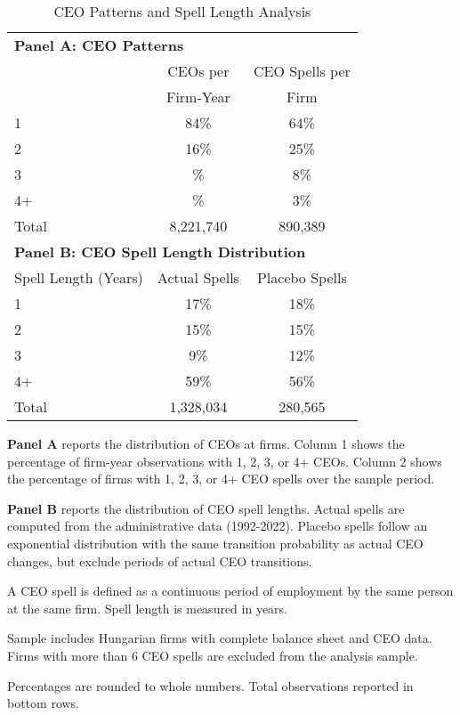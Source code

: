 \begin{table}[htbp]
\centering
\caption{CEO Patterns and Spell Length Analysis}
\label{tab:ceo_patterns}
\begin{tabular}{lcc}
\toprule
\multicolumn{3}{l}{\textbf{Panel A: CEO Patterns}} \\
 & CEOs per & CEO Spells per \\
 & Firm-Year & Firm \\
\midrule
1 & 84\% & 64\% \\
2 & 16\% & 25\% \\
3 & \% & 8\% \\
4+ & \% & 3\% \\
Total &    8,221,740 &      890,389 \\
\midrule
\multicolumn{3}{l}{\textbf{Panel B: CEO Spell Length Distribution}} \\
Spell Length (Years) & Actual Spells & Placebo Spells \\
\midrule
1 & 17\% & 18\% \\
2 & 15\% & 15\% \\
3 & 9\% & 12\% \\
4+ & 59\% & 56\% \\
Total &    1,328,034 &      280,565 \\
\bottomrule
\end{tabular}
\begin{tablenotes}[flushleft]
\footnotesize
\item \textbf{Panel A} reports the distribution of CEOs at firms. Column 1 shows the percentage of firm-year observations with 1, 2, 3, or 4+ CEOs. Column 2 shows the percentage of firms with 1, 2, 3, or 4+ CEO spells over the sample period.
\item \textbf{Panel B} reports the distribution of CEO spell lengths. Actual spells are computed from the administrative data (1992-2022). Placebo spells follow an exponential distribution with the same transition probability as actual CEO changes, but exclude periods of actual CEO transitions.
\item A CEO spell is defined as a continuous period of employment by the same person at the same firm. Spell length is measured in years.
\item Sample includes Hungarian firms with complete balance sheet and CEO data. Firms with more than 6 CEO spells are excluded from the analysis sample.
\item Percentages are rounded to whole numbers. Total observations reported in bottom rows.
\end{tablenotes}
\end{table}
